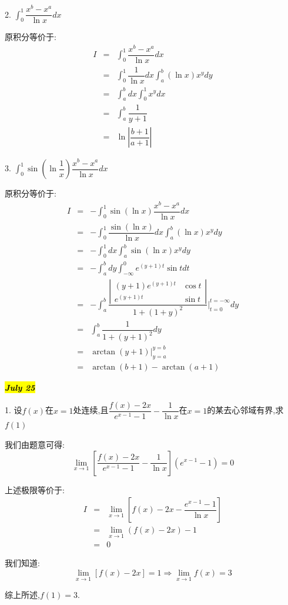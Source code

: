 2. $\int_{0}^{1}\dfrac{x^b-x^a}{\ln x}dx$
\begin{solution}
	
	原积分等价于: 
	\begin{eqnarray*}
		I&=&\int_{0}^{1}\dfrac{x^b-x^a}{\ln x}dx\\
		&=&\int_{0}^{1}\dfrac{1}{\ln x}dx\int_{a}^{b}(\ln x)x^{y}dy\\
		&=&\int_{a}^{b}dx\int_{0}^{1}x^{y}dx\\
		&=&\int_{a}^{b}\dfrac{1}{y+1}\\
		&=&\ln|\dfrac{b+1}{a+1}|
	\end{eqnarray*}
\end{solution}

3. $\int_{0}^{1}\sin (\ln\dfrac{1}{x})\dfrac{x^b-x^a}{\ln x}dx$
\begin{solution}
	
	原积分等价于: 
	\begin{eqnarray*}
		I&=&-\int_{0}^{1}\sin (\ln x)\dfrac{x^b-x^a}{\ln x}dx\\
		&=&-\int_{0}^{1}\dfrac{\sin (\ln x)}{\ln x}dx\int_{a}^{b}(\ln x)x^{y}dy\\
		&=&-\int_{0}^{1}dx\int_{a}^{b}\sin (\ln x)x^{y}dy\\
		&=&-\int_{a}^{b}dy\int_{-\infty}^{0}e^{(y+1)t}\sin tdt\\
		&=&-\int_{a}^{b}\dfrac{\left|\begin{matrix}
				(y+1)e^{(y+1)t}&\cos t\\e^{(y+1)t}&\sin t
			\end{matrix} \right| }{1+(1+y)^2}|_{t=0}^{t=-\infty}dy\\
		&=&\int_{a}^{b}\dfrac{1}{1+(y+1)^2}dy\\
		&=&\arctan (y+1)|_{y=a}^{y=b}\\
		&=&\arctan(b+1)-\arctan(a+1)
	\end{eqnarray*}
\end{solution}
\hl{\textbf{\textit{July 25}}}

1. 设$f(x)$在$x=1$处连续,且$\dfrac{f(x)-2x}{e^{x-1}-1}-\dfrac{1}{\ln x}$在$x=1$的某去心邻域有界,求$f(1)$
\begin{solution}
	
	我们由题意可得: 
	$$\lim\limits_{x\rightarrow 1}[\dfrac{f(x)-2x}{e^{x-1}-1}-\dfrac{1}{\ln x}](e^{x-1}-1)=0$$
	
	上述极限等价于: 
	\begin{eqnarray*}
		I&=&\lim\limits_{x\rightarrow 1}[f(x)-2x-\dfrac{e^{x-1}-1}{\ln x}]\\
		&=&\lim\limits_{x\rightarrow 1}(f(x)-2x)-1\\
		&=&0
	\end{eqnarray*}
	
	我们知道: $$\lim\limits_{x\rightarrow 1}[f(x)-2x]=1\Rightarrow \lim\limits_{x\rightarrow 1}f(x)=3$$
	
	综上所述,$f(1)=3$.
\end{solution}

